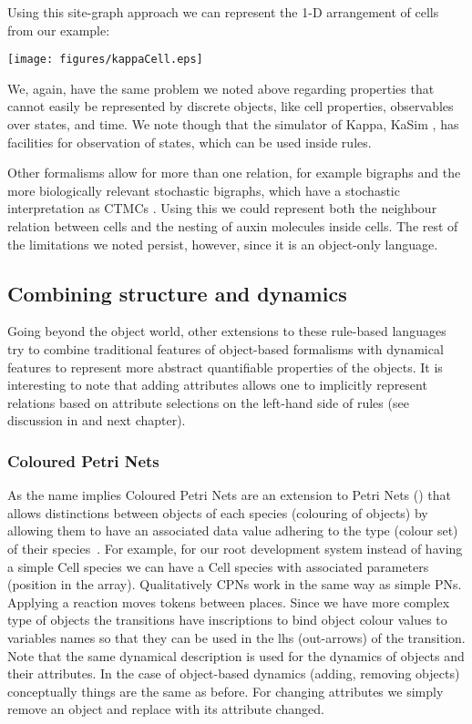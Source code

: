Using this site-graph approach we can represent the 1-D arrangement of cells from
our example:
\begin{center}
    \texttt{[image: figures/kappaCell.eps]}
\end{center}
We, again, have the same problem we noted above regarding properties that cannot
easily be represented by discrete objects, like cell properties, observables
over states, and time. We note though that the simulator of Kappa, KaSim
\citep{kasimmanual2018}, has facilities for observation of states, which can be
used inside rules.

Other formalisms allow for more than one relation, for example bigraphs
\citep{milner1999communicating} and the more biologically relevant stochastic
bigraphs, which have a stochastic interpretation as CTMCs
\citep{krivine_stochastic_2008}. Using this we could represent both the
neighbour relation between cells and the nesting of auxin molecules inside
cells. The rest of the limitations we noted persist, however, since it is an
object-only language.

\subsection{Combining structure and dynamics}
\label{subsec:structDynLangs}
Going beyond the object world, other extensions to these rule-based languages
try to combine traditional features of object-based formalisms with dynamical
features to represent more abstract quantifiable properties of the objects.  It
is interesting to note that adding attributes allows one to implicitly represent
relations based on attribute selections on the left-hand side of rules (see
discussion in  and next chapter).

\subsubsection*{Coloured Petri Nets}
\label{subsec:cpns}
As the name implies Coloured Petri Nets are an extension to Petri Nets
() that allows distinctions between objects of each species
(colouring of objects) by allowing them to have an associated data value
adhering to the type (colour set) of their
species~\citep{jensen_coloured_1987}. For example, for our root development
system instead of having a simple $\mathrm{Cell}$ species we can have a
$\mathrm{Cell}$ species with associated parameters (\eg position in the
array). Qualitatively CPNs work in the same way as simple PNs. Applying a
reaction moves tokens between places. Since we have more complex type of objects
the transitions have inscriptions to bind object colour values to variables
names so that they can be used in the lhs (out-arrows) of the transition. Note
that the same dynamical description is used for the dynamics of objects and
their attributes. In the case of object-based dynamics (adding, removing
objects) conceptually things are the same as before. For changing attributes we
simply remove an object and replace with its attribute changed.

